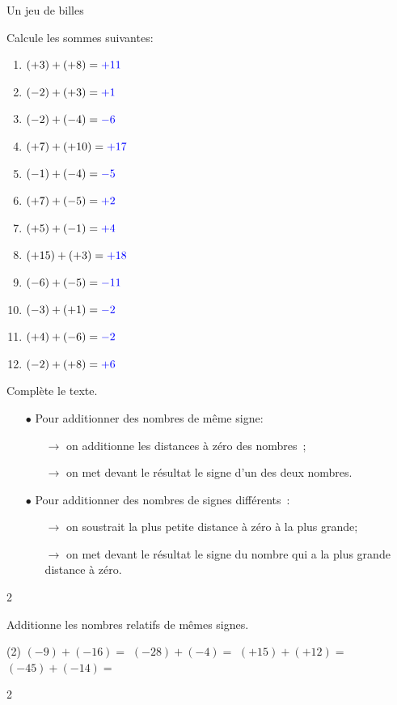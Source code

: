 \documentclass[a4paper,11pt]{report}
\begin{document}
\begin{resolu}{Un jeu de billes}
{\begin{tasks}
\task Calcule les sommes suivantes:
\begin{multicols}{2}
\begin{enumerate}
\item $(+3)+(+8)={\color{blue} +11 }$
\item $(-2)+(+3)={\color{blue}  +1}$
\item $(-2)+(-4)={\color{blue}  -6}$
\item $(+7)+(+10)={\color{blue} +17 }$
\item $(-1)+(-4)= {\color{blue}  -5}$
\item $(+7)+(-5)={\color{blue}  +2}$
\item $(+5)+(-1)={\color{blue}  +4}$
\item $(+15)+(+3)={\color{blue}  +18}$
\item $(-6)+(-5)={\color{blue}  -11}$
\item $(-3)+(+1)={\color{blue}  -2}$
\item $(+4)+(-6)={\color{blue}  -2}$
\item $(-2)+(+8)={\color{blue}  +6}$
\end{enumerate}
\end{multicols}
\item Complète le texte.
\begin{enumerate}
\item[$\bullet$] Pour additionner des nombres de même signe:
\begin{enumerate}
\item[$\rightarrow$] on {\color{blue}additionne} les distances à zéro des nombres~;
\item[$\rightarrow$] on met devant le résultat le signe {\color{blue}d'un des deux nombres}.
\end{enumerate}
\item[$\bullet$] Pour additionner des nombres de signes différents~:
\begin{enumerate}
\item[$\rightarrow$] on {\color{blue}soustrait} la plus petite distance à zéro à la plus grande;
\item[$\rightarrow$] on met devant le résultat le signe {\color{blue}du nombre qui a la plus grande distance à zéro}.
\end{enumerate}
\end{enumerate}
\end{tasks}
}{2}
\end{resolu}

\begin{exop}
{Additionne les nombres relatifs de mêmes signes.
\begin{tasks}(2)
\task $(-9)+(-16)=$
\task $(-28)+(-4)=$
\task $(+15)+(+12)=$
\task $(-45)+(-14)=$
\end{tasks}}{2}
\end{exop}
\end{document}
